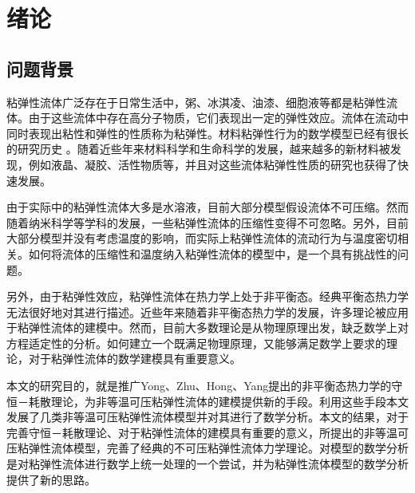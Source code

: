  \chapter{绪论}

\section{问题背景}
粘弹性流体广泛存在于日常生活中，粥、冰淇凌、油漆、细胞液等都是粘弹性流体。由于这些流体中存在高分子物质，它们表现出一定的弹性效应。流体在流动中同时表现出粘性和弹性的性质称为粘弹性。材料粘弹性行为的数学模型已经有很长的研究历史\cite{maxwell2013scientific,kelvin1887stability,oldroyd1950formulation,weissenberg1947continuum,zimm1956dynamics,ferry1980viscoelastic,larson1999structure} 。随着近些年来材料科学和生命科学的发展，越来越多的新材料被发现，例如液晶、凝胶、活性物质等\cite{de1975physics,prost2015active,marchetti2013hydrodynamics,ramaswamy2010mechanics,berthier2013non}，并且对这些流体粘弹性性质的研究也获得了快速发展\cite{lin2012some,larson1999structure,joseph2013fluid}。

由于实际中的粘弹性流体大多是水溶液，目前大部分模型假设流体不可压缩。然而随着纳米科学等学科的发展，一些粘弹性流体的压缩性变得不可忽略\cite{yu2015compressible,galstyan2015note,chakraborty2015constitutive,pelton2009damping,kim1999numerical,lind2013bubble}。另外，目前大部分模型并没有考虑温度的影响，而实际上粘弹性流体的流动行为与温度密切相关。如何将流体的压缩性和温度纳入粘弹性流体的模型中，是一个具有挑战性的问题\cite{grmela1997dynamicsI,ottinger1997dynamicsII,larson1999structure}。

另外，由于粘弹性效应，粘弹性流体在热力学上处于非平衡态。经典平衡态热力学无法很好地对其进行描述。近些年来随着非平衡态热力学的发展，许多理论被应用于粘弹性流体的建模中\cite{jou1996extended,beris2013thermodynamics,ottinger2005beyond,coleman1961foundations,coleman1964thermodynamics,truesdell2012rational,truesdell2004non,eringen2012microcontinuum,eringen1965theory,zhu2014conservation}。然而，目前大多数理论是从物理原理出发，缺乏数学上对方程适定性的分析。如何建立一个既满足物理原理，又能够满足数学上要求的理论，对于粘弹性流体的数学建模具有重要意义\cite{zhu2014conservation,larson1999structure}。

本文的研究目的，就是推广Yong、Zhu、Hong、Yang提出的非平衡态热力学的守恒－耗散理论，为非等温可压粘弹性流体的建模提供新的手段。利用这些手段本文发展了几类非等温可压粘弹性流体模型并对其进行了数学分析。本文的结果，对于完善守恒－耗散理论、对于粘弹性流体的建模具有重要的意义，所提出的非等温可压粘弹性流体模型，完善了经典的不可压粘弹性流体力学理论。对模型的数学分析是对粘弹性流体进行数学上统一处理的一个尝试，并为粘弹性流体模型的数学分析提供了新的思路。


